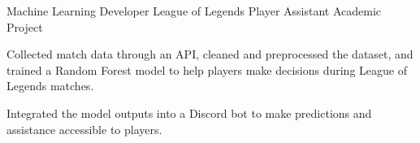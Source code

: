 
\begin{cventries}
  \cventry
    {Machine Learning Developer}
    {League of Legends Player Assistant}
    {Academic Project}
    {}
    {
      \begin{cvitems}
        \item {Collected match data through an API, cleaned and preprocessed the dataset, and trained a Random Forest model to help players make decisions during League of Legends matches.}
        \item {Integrated the model outputs into a Discord bot to make predictions and assistance accessible to players.}
      \end{cvitems}
    }
\end{cventries}
